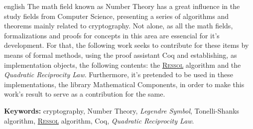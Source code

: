 \begin{resumo}[Abstract]
        \begin{otherlanguage*}{english}
                The math field known as Number Theory has a great influence in the study fields from Computer Science, presenting a series of algorithms and theorems mainly related to cryptography. Not alone, as all the math fields, formalizations and proofs for concepts in this area are essencial for it's development. For that, the following work seeks to contribute for these items by means of formal methods, using the proof assistant Coq and establishing, as implementation objects, the following contents: the \hyperref[algo:ressol]{\textsc{Ressol}} algorithm and the \textit{Quadratic Reciprocity Law}. Furthermore, it's pretended to be used in these implementations, the library Mathematical Components, in order to make this work's result to serve as a contribution for the same.  
                
                
                \vspace{\onelineskip}
                
                \noindent
                \textbf{Keywords:} cryptography, Number Theory, \textit{Legendre Symbol}, Tonelli-Shanks algorithm, \hyperref[algo:ressol]{\textsc{Ressol}} algorithm, Coq, \textit{Quadratic Reciprocity Law}.
        \end{otherlanguage*}
\end{resumo}